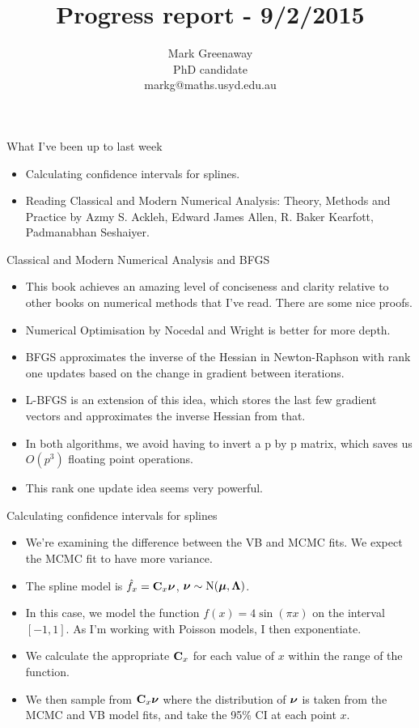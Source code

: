 \documentclass{beamer}
\title{Progress report - 9/2/2015}
\author{Mark Greenaway\\PhD candidate\\markg@maths.usyd.edu.au}
\begin{document}
\begin{frame}
\maketitle
\end{frame}

\begin{frame}{What I've been up to last week}
\begin{itemize}
\item Calculating confidence intervals for splines.
\item Reading Classical and Modern Numerical Analysis: Theory, Methods and Practice by Azmy S. Ackleh,
			Edward James Allen, R. Baker Kearfott, Padmanabhan Seshaiyer.
\end{itemize}
\end{frame}

\begin{frame}{Classical and Modern Numerical Analysis and BFGS}
\begin{itemize}
\item This book achieves an amazing level of conciseness and clarity relative to other books on numerical
			methods that I've read. There are some nice proofs.
\item Numerical Optimisation by Nocedal and Wright is better for more depth.
\item BFGS approximates the inverse of the Hessian in Newton-Raphson with rank one updates based on
			the change in	gradient between iterations.
\item L-BFGS is an extension of this idea, which stores the last few gradient vectors and approximates the
			inverse Hessian from that.
\item In both algorithms, we avoid having to invert a p by p matrix, which saves us $O(p^3)$ floating
			point operations.
\item This rank one update idea seems very powerful.
\end{itemize}
\end{frame}

\begin{frame}{Calculating confidence intervals for splines}
\begin{itemize}
\item We're examining the difference between the VB and MCMC fits. We expect the MCMC fit to have
more variance.
\item The spline model is $\hat{f}_x = {\bf C}_x {\boldsymbol \nu}$, ${\boldsymbol \nu} \sim \text{N}({\boldsymbol \mu}, {\boldsymbol \Lambda})$.
\item In this case, we model the function $f(x) = 4 \sin(\pi x)$ on the interval $[-1, 1]$. As I'm
			working with Poisson models, I then exponentiate.
\item We calculate the appropriate ${\bf C}_x$ for each value of $x$ within the range of the function.
\item We then sample from ${\bf C}_x {\boldsymbol \nu}$ where the distribution of ${\boldsymbol \nu}$ is taken from the MCMC and VB
			model fits, and take the 95\% CI at each point $x$.
\end{itemize}
\end{frame}
\end{document}
